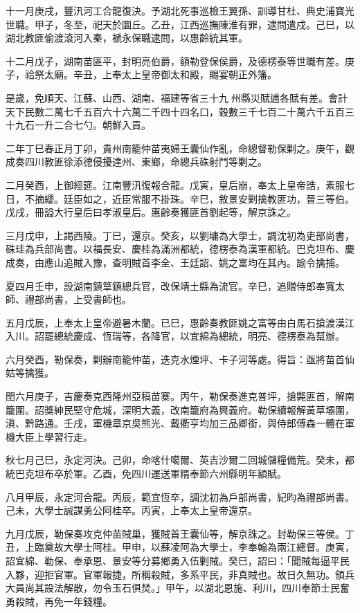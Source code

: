 \begin{pinyinscope}
十一月庚戌，豐汛河工合龍復決。予湖北死事巡檢王翼孫、訓導甘杜、典史浦寶光世職。甲子，冬至，祀天於圜丘。乙丑，江西巡撫陳淮有罪，逮問遣戍。己巳，以湖北教匪偷渡滾河入秦，褫永保職逮問，以惠齡統其軍。

十二月戊子，湖南苗匪平，封明亮伯爵，額勒登保侯爵，及德楞泰等世職有差。庚子，祫祭太廟。辛丑，上奉太上皇帝御太和殿，賜宴朝正外籓。

是歲，免順天、江蘇、山西、湖南、福建等省三十九州縣災賦逋各賦有差。會計天下民數二萬七千五百六十六萬二千四十四名口，穀數三千七百二十萬六千五百三十九石一升二合七勺。朝鮮入貢。

二年丁巳春正月丁卯，貴州南籠仲苗夷婦王囊仙作亂，命總督勒保剿之。庚午，觀成奏四川教匪徐添德侵擾達州、東鄉，命總兵硃射鬥等剿之。

二月癸酉，上御經筵。江南豐汛復報合龍。戊寅，皇后崩，奉太上皇帝誥，素服七日，不摘纓。廷臣如之，近臣常服不掛珠。辛巳，敘景安剿擒教匪功，晉三等伯。戊戌，冊謚大行皇后曰孝淑皇后。惠齡奏獲匪首劉起等，解京誅之。

三月戊申，上謁西陵。丁巳，還京。癸亥，以劉墉為大學士，調沈初為吏部尚書，硃珪為兵部尚書。以福長安、慶桂為滿洲都統，德楞泰為漢軍都統。巴克坦布、慶成奏，由應山追賊入豫，查明賊首李全、王廷詔、姚之富均在其內。諭令擒捕。

夏四月壬申，設湖南鎮筸鎮總兵官，改保靖土縣為流官。辛巳，追贈侍郎奉寬太師、禮部尚書，上受書師也。

五月戊辰，上奉太上皇帝避暑木蘭。已巳，惠齡奏教匪姚之富等由白馬石搶渡漢江入川。詔罷總統慶成、恆瑞等，各降官，以宜綿為總統，明亮、德楞泰為幫辦。

六月癸酉，勒保奏，剿辦南籠仲苗，迭克水煙坪、卡子河等處。得旨：亟將苗首仙姑等擒獲。

閏六月庚子，吉慶奏克西隆州亞稿苗寨。丙午，勒保奏進克普坪，搶斃匪首，解南籠圍。詔獎紳民堅守危城，深明大義，改南籠府為興義府。勒保續報解黃草壩圍，滇、黔路通。壬戌，軍機章京吳熊光、戴衢亨均加三品卿銜，與侍郎傅森一體在軍機大臣上學習行走。

秋七月己巳，永定河決。己卯，命喀什噶爾、英吉沙爾二回城儲糧備荒。癸未，都統巴克坦布卒於軍。乙酉，免四川運送軍糈奉節六州縣明年額賦。

八月甲辰，永定河合龍。丙辰，範宜恆卒，調沈初為戶部尚書，紀昀為禮部尚書。己未，大學士誠謀勇公阿桂卒。丙寅，上奉太上皇帝還京。

九月戊辰，勒保奏攻克仲苗賊巢，獲賊首王囊仙等，解京誅之。封勒保三等侯。丁丑，上臨奠故大學士阿桂。甲申，以蘇凌阿為大學士，李奉翰為兩江總督。庚寅，詔宜綿、勒保、奉承恩、景安等分募鄉勇入伍剿賊。癸巳，詔曰：「聞賊每逼平民入夥，迎拒官軍。官軍報捷，所稱殺賊，多系平民，非真賊也。故日久無功。領兵大員尚其設法解散，勿令玉石俱焚。」甲午，以湖北恩施、利川，四川奉節士民奮勇殺賊，再免一年錢糧。


\end{pinyinscope}
